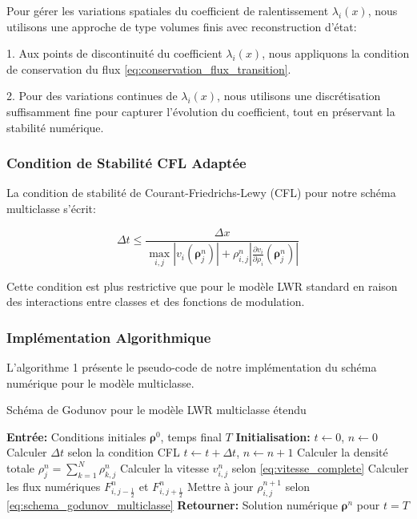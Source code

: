 Pour gérer les variations spatiales du coefficient de ralentissement $\lambda_i(x)$, nous utilisons une approche de type volumes finis avec reconstruction d'état:

1. Aux points de discontinuité du coefficient $\lambda_i(x)$, nous appliquons la condition de conservation du flux \eqref{eq:conservation_flux_transition}.

2. Pour des variations continues de $\lambda_i(x)$, nous utilisons une discrétisation suffisamment fine pour capturer l'évolution du coefficient, tout en préservant la stabilité numérique.

\subsubsection{Condition de Stabilité CFL Adaptée}
\label{subsubsec:condition_cfl}

La condition de stabilité de Courant-Friedrichs-Lewy (CFL) pour notre schéma multiclasse s'écrit:

\begin{equation}
\Delta t \leq \frac{\Delta x}{\max_{i,j} |v_i(\boldsymbol{\rho}^n_j)| + \rho_{i,j}^n\left|\frac{\partial v_i}{\partial \rho_i}(\boldsymbol{\rho}^n_j)\right|}
\end{equation}

Cette condition est plus restrictive que pour le modèle LWR standard en raison des interactions entre classes et des fonctions de modulation.

\subsubsection{Implémentation Algorithmique}
\label{subsubsec:implementation_algorithmique}

L'algorithme 1 présente le pseudo-code de notre implémentation du schéma numérique pour le modèle multiclasse.

\begin{algorithm}
\caption{Schéma de Godunov pour le modèle LWR multiclasse étendu}
\begin{algorithmic}[1]
\State \textbf{Entrée:} Conditions initiales $\boldsymbol{\rho}^0$, temps final $T$
\State \textbf{Initialisation:} $t \gets 0$, $n \gets 0$
    \State Calculer $\Delta t$ selon la condition CFL
    \State $t \gets t + \Delta t$, $n \gets n + 1$
            \State Calculer la densité totale $\rho_j^n = \sum_{k=1}^N \rho_{k,j}^n$
            \State Calculer la vitesse $v_{i,j}^n$ selon \eqref{eq:vitesse_complete}
            \State Calculer les flux numériques $F_{i,j-\frac{1}{2}}^n$ et $F_{i,j+\frac{1}{2}}^n$
            \State Mettre à jour $\rho_{i,j}^{n+1}$ selon \eqref{eq:schema_godunov_multiclasse}
        \EndFor
    \EndFor
\EndWhile
\State \textbf{Retourner:} Solution numérique $\boldsymbol{\rho}^n$ pour $t = T$
\end{algorithmic}
\end{algorithm}

